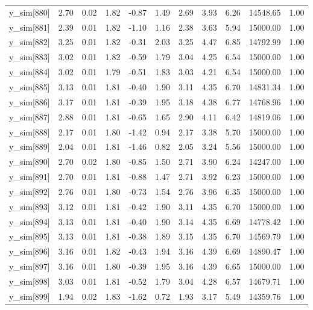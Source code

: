 \begin{table}[ht]
\begin{tabular}{rrrrrrrrrrr}
  y\_sim[880] & 2.70 & 0.02 & 1.82 & -0.87 & 1.49 & 2.69 & 3.93 & 6.26 & 14548.65 & 1.00 \\ 
  y\_sim[881] & 2.39 & 0.01 & 1.82 & -1.10 & 1.16 & 2.38 & 3.63 & 5.94 & 15000.00 & 1.00 \\ 
  y\_sim[882] & 3.25 & 0.01 & 1.82 & -0.31 & 2.03 & 3.25 & 4.47 & 6.85 & 14792.99 & 1.00 \\ 
  y\_sim[883] & 3.02 & 0.01 & 1.82 & -0.59 & 1.79 & 3.04 & 4.25 & 6.54 & 15000.00 & 1.00 \\ 
  y\_sim[884] & 3.02 & 0.01 & 1.79 & -0.51 & 1.83 & 3.03 & 4.21 & 6.54 & 15000.00 & 1.00 \\ 
  y\_sim[885] & 3.13 & 0.01 & 1.81 & -0.40 & 1.90 & 3.11 & 4.35 & 6.70 & 14831.34 & 1.00 \\ 
  y\_sim[886] & 3.17 & 0.01 & 1.81 & -0.39 & 1.95 & 3.18 & 4.38 & 6.77 & 14768.96 & 1.00 \\ 
  y\_sim[887] & 2.88 & 0.01 & 1.81 & -0.65 & 1.65 & 2.90 & 4.11 & 6.42 & 14819.06 & 1.00 \\ 
  y\_sim[888] & 2.17 & 0.01 & 1.80 & -1.42 & 0.94 & 2.17 & 3.38 & 5.70 & 15000.00 & 1.00 \\ 
  y\_sim[889] & 2.04 & 0.01 & 1.81 & -1.46 & 0.82 & 2.05 & 3.24 & 5.56 & 15000.00 & 1.00 \\ 
  y\_sim[890] & 2.70 & 0.02 & 1.80 & -0.85 & 1.50 & 2.71 & 3.90 & 6.24 & 14247.00 & 1.00 \\ 
  y\_sim[891] & 2.70 & 0.01 & 1.81 & -0.88 & 1.47 & 2.71 & 3.92 & 6.23 & 15000.00 & 1.00 \\ 
  y\_sim[892] & 2.76 & 0.01 & 1.80 & -0.73 & 1.54 & 2.76 & 3.96 & 6.35 & 15000.00 & 1.00 \\ 
  y\_sim[893] & 3.12 & 0.01 & 1.81 & -0.42 & 1.90 & 3.11 & 4.35 & 6.70 & 15000.00 & 1.00 \\ 
  y\_sim[894] & 3.13 & 0.01 & 1.81 & -0.40 & 1.90 & 3.14 & 4.35 & 6.69 & 14778.42 & 1.00 \\ 
  y\_sim[895] & 3.13 & 0.01 & 1.81 & -0.38 & 1.89 & 3.15 & 4.35 & 6.70 & 14569.79 & 1.00 \\ 
  y\_sim[896] & 3.16 & 0.01 & 1.82 & -0.43 & 1.94 & 3.16 & 4.39 & 6.69 & 14890.47 & 1.00 \\ 
  y\_sim[897] & 3.16 & 0.01 & 1.80 & -0.39 & 1.95 & 3.16 & 4.39 & 6.65 & 15000.00 & 1.00 \\ 
  y\_sim[898] & 3.03 & 0.01 & 1.81 & -0.52 & 1.79 & 3.04 & 4.28 & 6.57 & 14679.71 & 1.00 \\ 
  y\_sim[899] & 1.94 & 0.02 & 1.83 & -1.62 & 0.72 & 1.93 & 3.17 & 5.49 & 14359.76 & 1.00 \\ 

\end{tabular}
\end{table}
